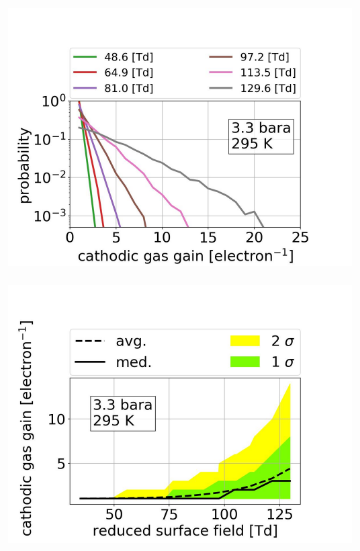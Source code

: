\begin{figure}[!htbp]
	\centering
	\begin{subfigure}[b]{0.7\textwidth}
		\centering
		\includegraphics[width=\figurewidth,clip,trim={0 0 0 0}]{Figures/GasTest/xenonProperties/PhotonMultiplicationNaiveReduced.jpg}
		\caption{}
		\label{fig:electron multiplication ind}
	\end{subfigure}
	\begin{subfigure}[b]{0.7\textwidth}
		\centering
		\includegraphics[width=\figurewidth,clip,trim={0 0 0 0}]{Figures/GasTest/xenonProperties/MultiplicationMeanSigma3300mbarReduced.jpg}
		\caption{}
		\label{fig:electron multiplication para}

\end{subfigure}
\end{figure}
